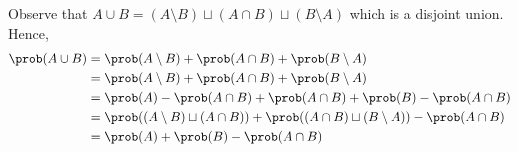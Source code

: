 Observe that $A\cup B=(A\setminus B)\sqcup(A\cap B)\sqcup(B\setminus A)$ which is a disjoint union. Hence,
\begin{align*}
    \prob(A\cup B)&=\prob(A\setminus B)+\prob(A\cap B)+\prob(B\setminus A)\\
    &=\prob(A\setminus B)+\prob(A\cap B)+\prob(B\setminus A)\\
    &=\prob(A)-\prob(A\cap B)+\prob(A\cap B)+\prob(B)-\prob(A\cap B)\\
    &=\prob((A\setminus B)\sqcup(A\cap B))+\prob((A\cap B)\sqcup(B\setminus A))-\prob(A\cap B)\\
    &=\prob(A)+\prob(B)-\prob(A\cap B)
\end{align*}
